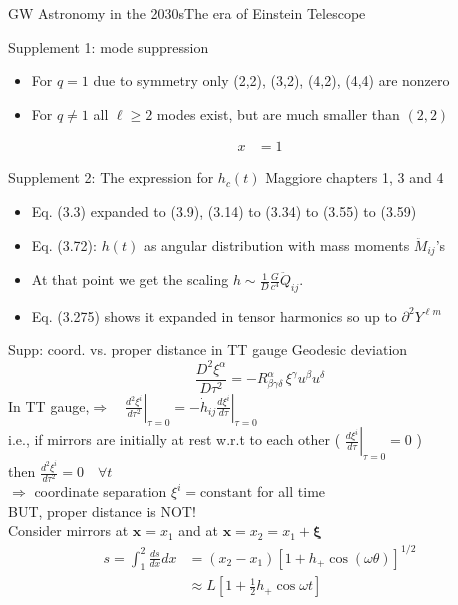 \documentclass[xcolor=dvipsnames,handout,t]{beamer}
\renewcommand{\t}{\theta}
\begin{document}
\begin{frame}{GW Astronomy in the 2030s}{The era of Einstein Telescope}
 
\end{frame}




\begin{frame}{Supplement 1: mode suppression}
\begin{itemize}
 \item For $q=1$ due to symmetry only (2,2), (3,2), (4,2), (4,4) are nonzero 
 \item For $q\ne 1$ all $\ell \ge 2$ modes exist, but are much smaller than $(2,2)$
\end{itemize}
\begin{align*}
      x &=1
      \end{align*}
\end{frame}


\begin{frame}{Supplement 2: The expression for $h_c(t)$}
Maggiore chapters 1, 3 and 4
\begin{itemize}
 \item Eq. (3.3) expanded to (3.9), (3.14) to (3.34) to (3.55) to (3.59)
 \item Eq. (3.72): $h(t)$ as angular distribution with mass moments $\ddot{M}_{ij}$'s
 \item At that point we get the scaling $h \sim \tfrac{1}{D}\tfrac{G}{c^4}\ddot{Q}_{ij}$.
 \item Eq. (3.275) shows it expanded in tensor harmonics so up to $\partial^2 Y^{\ell m}$
\end{itemize}
\end{frame}

\begin{frame}{Supp: coord. vs. proper distance in TT gauge}
  Geodesic deviation 
  \[
   \frac{D^2 \xi^\alpha}{D\tau^2} = -R^\alpha_{\beta \gamma\delta}\, \xi^\gamma u^\beta u^\delta 
  \]
In TT gauge,\qquad  $\Longrightarrow \quad\left.\tfrac{d^2 \xi^i}{d\tau^2}\right|_{\tau=0} = -\left. \dot{h}_{ij} \tfrac{d\xi^i}{d\tau}\right|_{\tau=0}$\\
i.e., if mirrors are initially at rest w.r.t to each other ( $\left. \tfrac{d\xi^i}{d\tau}\right|_{\tau=0} =0$ )\\
then $\tfrac{d^2 \xi^i}{d\tau^2}=0\quad \forall t$ \\
$\Longrightarrow$ coordinate separation $\xi^i = \text{constant}$ for all time \\
BUT, proper distance is NOT! \\
Consider mirrors at $\mathbf{x}=x_1$ and at $\mathbf{x}=x_2=x_1+\mathbf{\xi}$
\begin{align*}
  s = \int_1^2 \tfrac{ds}{dx}dx &= (x_2-x_1) \left[ 1 + h_+ \cos(\omega\t)\right]^{1/2} \\
			      & \approx L \left[ 1+\tfrac{1}{2} h_+ \cos\omega t \right] 
\end{align*}
 \end{frame}
\end{document}
